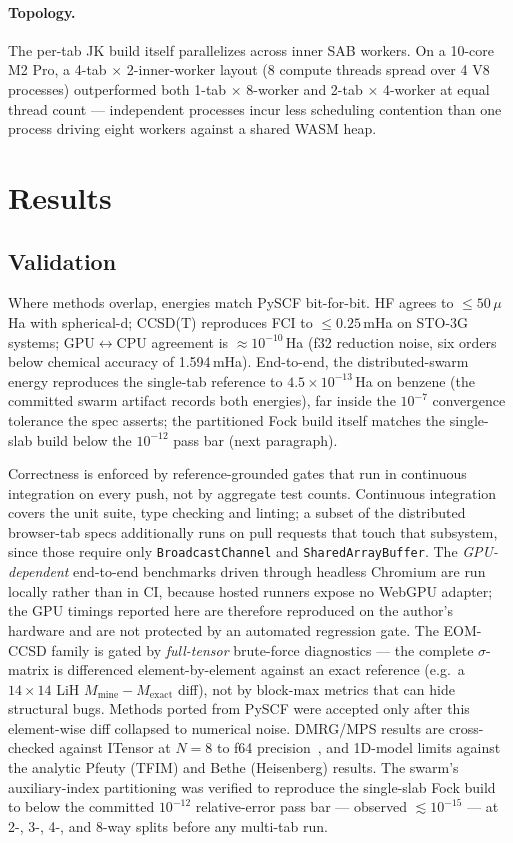\documentclass[11pt]{article}
\begin{document}
\paragraph{Topology.} The per-tab JK build itself parallelizes across inner SAB
workers. On a 10-core M2 Pro, a 4-tab $\times$ 2-inner-worker layout (8 compute
threads spread over 4 V8 processes) outperformed both 1-tab $\times$ 8-worker
and 2-tab $\times$ 4-worker at equal thread count --- independent processes
incur less scheduling contention than one process driving eight workers against
a shared WASM heap.

\section{Results}

\subsection{Validation}
\label{sec:validation}

Where methods overlap, energies match PySCF bit-for-bit. HF agrees to
$\le 50\,\mu$Ha with spherical-d; CCSD(T) reproduces FCI to $\le 0.25$\,mHa on
STO-3G systems; GPU$\leftrightarrow$CPU agreement is $\approx 10^{-10}$\,Ha
(f32 reduction noise, six orders below chemical accuracy of 1.594\,mHa).
End-to-end, the distributed-swarm energy reproduces the single-tab reference to
$4.5\times10^{-13}$\,Ha on benzene (the committed swarm artifact records both
energies), far inside the $10^{-7}$ convergence tolerance the spec asserts; the
partitioned Fock build itself matches the single-slab build below the
$10^{-12}$ pass bar (next paragraph).

Correctness is enforced by reference-grounded gates that run in continuous
integration on every push, not by aggregate test counts. Continuous integration
covers the unit suite, type checking and linting; a subset of the distributed
browser-tab specs additionally runs on pull requests that touch that subsystem,
since those require only \texttt{BroadcastChannel} and \texttt{SharedArrayBuffer}.
The \emph{GPU-dependent} end-to-end benchmarks driven through headless Chromium
are run locally rather than in CI, because hosted runners expose no WebGPU
adapter; the GPU timings reported here are therefore reproduced on the author's
hardware and are not protected by an automated regression gate. The EOM-CCSD family
is gated by \emph{full-tensor} brute-force diagnostics --- the complete
$\sigma$-matrix is differenced element-by-element against an exact reference
(e.g.\ a $14\times14$ LiH $M_{\mathrm{mine}} - M_{\mathrm{exact}}$ diff), not by
block-max metrics that can hide structural bugs. Methods ported from PySCF were
accepted only after this element-wise diff collapsed to numerical noise.
DMRG/MPS results are cross-checked against ITensor at $N=8$ to f64
precision~\cite{schollwock}, and 1D-model limits against the analytic Pfeuty
(TFIM) and Bethe (Heisenberg) results. The swarm's auxiliary-index
partitioning was verified to reproduce the single-slab Fock build to below the
committed $10^{-12}$ relative-error pass bar --- observed $\lesssim 10^{-15}$
--- at 2-, 3-, 4-, and 8-way splits before any multi-tab run.
\end{document}
